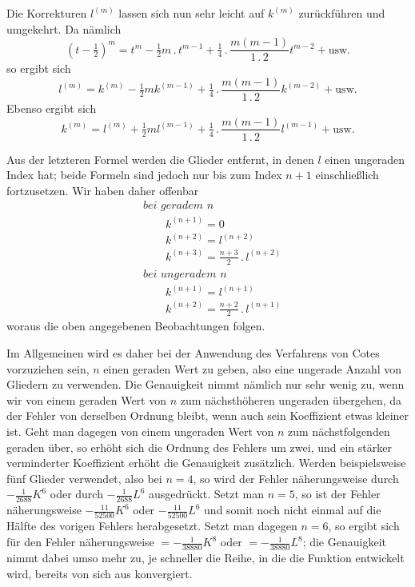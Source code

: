 Die Korrekturen $l^{(m)}$ lassen sich nun sehr leicht auf $k^{(m)}$ zurückführen und umgekehrt. Da nämlich
\[
(t-\tfrac12)^m=t^m-\tfrac12m\mathbin{.}t^{m-1}
+\tfrac14\mathbin{.}\frac{m(m-1)}{1\mathbin{.}2}t^{m-2}+\text{usw.}
\]
so ergibt sich
\[
l^{(m)}=k^{(m)}-\tfrac12m k^{(m-1)}
+\tfrac14\mathbin{.}\frac{m(m-1)}{1\mathbin{.}2}k^{(m-2)}+\text{usw.}
\]
Ebenso ergibt sich
\[
k^{(m)}=l^{(m)}+\tfrac12m l^{(m-1)}
+\tfrac14\mathbin{.}\frac{m(m-1)}{1\mathbin{.}2}l^{(m-1)}+\text{usw.}
\]



Aus der letzteren Formel werden die Glieder entfernt, in denen $l$ einen ungeraden Index hat; beide Formeln sind jedoch nur bis zum Index $n+1$ einschließlich fortzusetzen. Wir haben daher offenbar
\[
\begin{aligned}
&\textit{bei geradem $n$}\\
&\qquad k^{(n+1)}=0\\
&\qquad k^{(n+2)}=l^{(n+2)}\\
&\qquad k^{(n+3)}=\frac{n+3}{2}\mathbin{.}l^{(n+2)}\\
&\textit{bei ungeradem $n$}\\
&\qquad k^{(n+1)}=l^{(n+1)}\\
&\qquad k^{(n+2)}=\frac{n+2}{2}\mathbin{.}l^{(n+1)}
\end{aligned}
\]
woraus die oben angegebenen Beobachtungen folgen.

Im Allgemeinen wird es daher bei der Anwendung des Verfahrens von Cotes vorzuziehen sein, $n$ einen geraden Wert zu geben, also eine ungerade Anzahl von Gliedern zu verwenden. Die Genauigkeit nimmt nämlich nur sehr wenig zu, wenn wir von einem geraden Wert von $n$ zum nächsthöheren ungeraden übergehen, da der Fehler von derselben Ordnung bleibt, wenn auch sein Koeffizient etwas kleiner ist. Geht man dagegen von einem ungeraden Wert von $n$ zum nächstfolgenden geraden über, so erhöht sich die Ordnung des Fehlers um zwei, und ein stärker verminderter Koeffizient erhöht die Genauigkeit zusätzlich. Werden beispielsweise fünf Glieder verwendet, also bei $n=4$, so wird der Fehler näherungsweise durch $-\frac{1}{2688}K^6$ oder durch $-\frac{1}{2688}L^6$ ausgedrückt. Setzt man $n=5$, so ist der Fehler näherungsweise $-\frac{11}{52500}K^6$ oder $-\frac{11}{52500}L^6$ und somit noch nicht einmal auf die Hälfte des vorigen Fehlers herabgesetzt. Setzt man dagegen $n=6$, so ergibt sich für den Fehler näherungsweise $=-\frac{1}{38880}K^8$ oder $=-\frac{1}{38880}L^8$; die Genauigkeit nimmt dabei umso mehr zu, je schneller die Reihe, in die die Funktion entwickelt wird, bereits von sich aus konvergiert.

